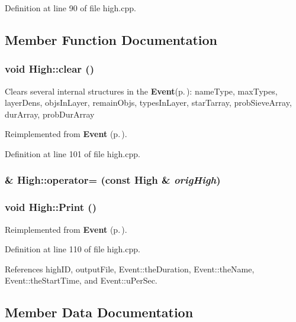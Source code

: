 Definition at line 90 of file high.cpp.

\subsection{Member Function Documentation}
\subsubsection{\setlength{\rightskip}{0pt plus 5cm}void High::clear ()\hspace{0.3cm}{\tt  [virtual]}}\label{classHigh_a4}


Clears several internal structures in the {\bf Event}{\rm (p.\,\pageref{classEvent})}: name\-Type, max\-Types, layer\-Dens, objs\-In\-Layer, remain\-Objs, types\-In\-Layer, star\-Tarray, prob\-Sieve\-Array, dur\-Array, prob\-Dur\-Array 

Reimplemented from {\bf Event} {\rm (p.\,\pageref{classEvent_a12})}.

Definition at line 101 of file high.cpp.
\subsubsection{\& High::operator= (const {\bf High} \& {\em orig\-High})}\label{classHigh_a3}


\subsubsection{\setlength{\rightskip}{0pt plus 5cm}void High::Print ()\hspace{0.3cm}{\tt  [virtual]}}\label{classHigh_a5}




Reimplemented from {\bf Event} {\rm (p.\,\pageref{classEvent_a57})}.

Definition at line 110 of file high.cpp.

References high\-ID, output\-File, Event::the\-Duration, Event::the\-Name, Event::the\-Start\-Time, and Event::u\-Per\-Sec.

\subsection{Member Data Documentation}
